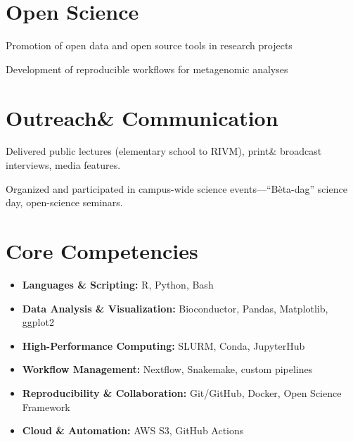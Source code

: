 \documentclass[a4paper,10pt]{article}
\begin{document}
\section*{Open Science}
\begin{description}
\raggedright
\item Promotion of open data and open source tools in research projects
\item Development of reproducible workflows for metagenomic analyses
\end{description}

\section*{Outreach\& Communication}
\begin{description}
\raggedright
\item Delivered public lectures (elementary school to RIVM), print\& broadcast interviews, media features.
\item Organized and participated in campus-wide science events—“Bèta-dag” science day, open-science seminars.
\end{description}


\section*{Core Competencies}
\begin{itemize}
  \item \textbf{Languages \& Scripting:} R, Python, Bash
  \item \textbf{Data Analysis \& Visualization:} Bioconductor, Pandas, Matplotlib, ggplot2
  \item \textbf{High-Performance Computing:} SLURM, Conda, JupyterHub
  \item \textbf{Workflow Management:} Nextflow, Snakemake, custom pipelines
  \item \textbf{Reproducibility \& Collaboration:} Git/GitHub, Docker, Open Science Framework
  \item \textbf{Cloud \& Automation:} AWS S3, GitHub Actions
\end{itemize}

\end{document}
